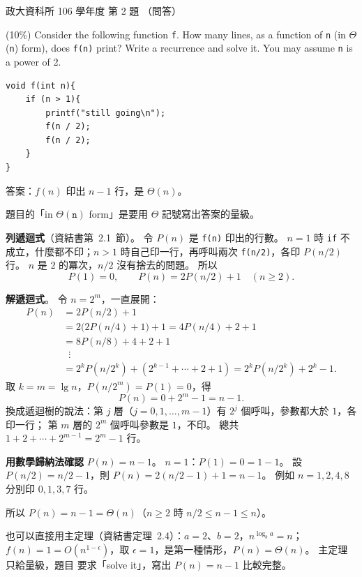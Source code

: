 \begin{pastexam}[label={px:nccu-106-dsa-02}]{政大資科所 106 學年度 第 2 題}
（問答）

(10\%) Consider the following function \texttt{f}. How many lines, as a function of \texttt{n}
(in $\Theta$(\texttt{n}) form), does \texttt{f(n)} print? Write a recurrence and solve it. You may
assume \texttt{n} is a power of 2.
\begin{verbatim}
void f(int n){
    if (n > 1){
        printf("still going\n");
        f(n / 2);
        f(n / 2);
    }
}
\end{verbatim}
\end{pastexam}

\begin{pastsoln}
答案：$f(n)$ 印出 $n - 1$ 行，是 $\Theta(n)$。

題目的「in $\Theta(\texttt{n})$ form」是要用 $\Theta$ 記號寫出答案的量級。

\textbf{列遞迴式}（資結書第~2.1~節）。 令 $P(n)$ 是 \texttt{f(n)} 印出的行數。 $n = 1$ 時
\texttt{if} 不成立，什麼都不印；$n > 1$ 時自己印一行，再呼叫兩次 \texttt{f(n/2)}，各印
$P(n/2)$ 行。 $n$ 是 $2$ 的冪次，$n/2$ 沒有捨去的問題。 所以
\[
P(1) = 0, \qquad P(n) = 2P(n/2) + 1 \quad (n \ge 2).
\]

\textbf{解遞迴式}。 令 $n = 2^m$，一直展開：
\begin{align*}
P(n) &= 2P(n/2) + 1 \\
     &= 2\bigl(2P(n/4) + 1\bigr) + 1 = 4P(n/4) + 2 + 1 \\
     &= 8P(n/8) + 4 + 2 + 1 \\
     &\;\;\vdots \\
     &= 2^k P(n/2^k) + (2^{k-1} + \cdots + 2 + 1) = 2^k P(n/2^k) + 2^k - 1.
\end{align*}
取 $k = m = \lg n$，$P(n/2^m) = P(1) = 0$，得
\[
P(n) = 0 + 2^m - 1 = n - 1.
\]
換成遞迴樹的說法：第 $j$ 層（$j = 0, 1, \ldots, m - 1$）有 $2^j$ 個呼叫，參數都大於 $1$，各印一行；
第 $m$ 層的 $2^m$ 個呼叫參數是 $1$，不印。 總共 $1 + 2 + \cdots + 2^{m-1} = 2^m - 1$ 行。

\textbf{用數學歸納法確認} $P(n) = n - 1$。 $n = 1$：$P(1) = 0 = 1 - 1$。 設 $P(n/2) = n/2 - 1$，則
$P(n) = 2(n/2 - 1) + 1 = n - 1$。 例如 $n = 1, 2, 4, 8$ 分別印 $0, 1, 3, 7$ 行。

所以 $P(n) = n - 1 = \Theta(n)$（$n \ge 2$ 時 $n/2 \le n - 1 \le n$）。

也可以直接用主定理（資結書定理~2.4）：$a = 2$、$b = 2$，$n^{\log_b a} = n$；$f(n) = 1 =
O(n^{1 - \epsilon})$，取 $\epsilon = 1$，是第一種情形，$P(n) = \Theta(n)$。 主定理只給量級，題目
要求「solve it」，寫出 $P(n) = n - 1$ 比較完整。
\end{pastsoln}
